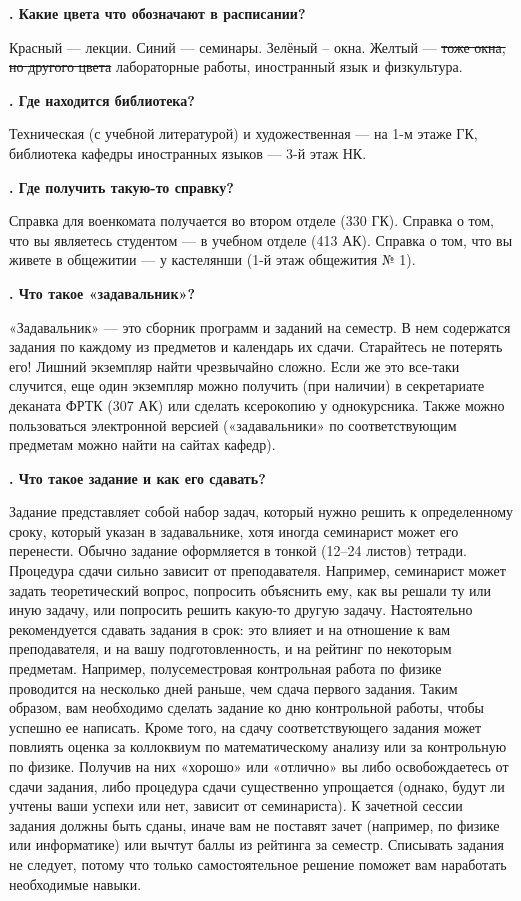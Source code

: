 \documentclass[14pt]{extarticle}
\newcounter{question}
\newcommand\Que[1]{%
    \begin{minipage}{\textwidth}
    \leavevmode\par
    \stepcounter{question}
    \noindent
    {\large\textbf{\thequestion. #1}}\par}
\newcommand\Ans[2][]{%
    \leavevmode\par\noindent
    {\leftskip37pt
    \textbf{#1}#2\par}
    \end{minipage}}
\begin{document}
\Que{Какие цвета что обозначают в расписании?}
\Ans{Красный — лекции. Синий — семинары. Зелёный -- окна. Желтый — \sout{тоже окна, но другого цвета} лабораторные работы, иностранный язык и физкультура.}

\Que{Где находится библиотека?}
\Ans{Техническая (с учебной литературой) и художественная — на 1-м этаже ГК, библиотека кафедры иностранных языков — 3-й этаж НК.}

\Que{Где получить такую-то справку?}
\Ans{Справка для военкомата получается во втором отделе (330 ГК). Справка о том, что вы являетесь студентом — в учебном отделе (413 АК). Справка о том, что вы живете в общежитии — у кастелянши (1-й этаж общежития № 1).}

\Que{Что такое «задавальник»?}
\Ans{«Задавальник» — это сборник программ и заданий на семестр. В нем содержатся задания по каждому из предметов и календарь их сдачи. Старайтесь не потерять его! Лишний экземпляр найти чрезвычайно сложно. Если же это все-таки случится, еще один экземпляр можно получить (при наличии) в секретариате деканата ФРТК (307 АК) или сделать ксерокопию у однокурсника. Также можно пользоваться электронной версией («задавальники» по соответствующим предметам можно найти на сайтах кафедр).}

\Que{Что такое задание и как его сдавать?}
\Ans{Задание представляет собой набор задач, который нужно решить к определенному сроку, который указан в задавальнике, хотя иногда семинарист может его перенести. Обычно задание оформляется в тонкой (12–24 листов) тетради. Процедура сдачи сильно зависит от преподавателя. Например, семинарист может задать теоретический вопрос, попросить объяснить ему, как вы решали ту или иную задачу, или попросить решить какую-то другую задачу. Настоятельно рекомендуется сдавать задания в срок: это влияет и на отношение к вам преподавателя, и на вашу подготовленность, и на рейтинг по некоторым предметам. Например, полусеместровая контрольная работа по физике проводится на несколько дней раньше, чем сдача первого задания. Таким образом, вам необходимо сделать задание ко дню контрольной работы, чтобы успешно ее написать. Кроме того, на сдачу соответствующего задания может повлиять оценка за коллоквиум по математическому анализу или за контрольную по физике. Получив на них «хорошо» или «отлично» вы либо освобождаетесь от сдачи задания, либо процедура сдачи существенно упрощается (однако, будут ли учтены ваши успехи или нет, зависит от семинариста). К зачетной сессии задания должны быть сданы, иначе вам не поставят зачет (например, по физике или информатике) или вычтут баллы из рейтинга за семестр. Списывать задания не следует, потому что только самостоятельное решение поможет вам наработать необходимые навыки.}
\end{document}
